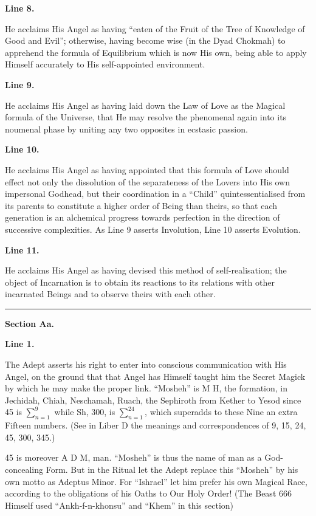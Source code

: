 \textbf{Line 8.}


He acclaims His Angel as having \enquote{eaten of the Fruit of the Tree of Knowledge of Good and Evil}; otherwise, having become wise (in the Dyad Chokmah) to apprehend the formula of Equilibrium which is now His own, being able to apply Himself accurately to His self-appointed environment.


\textbf{Line 9.}


He acclaims His Angel as having laid down the Law of Love as the Magical formula of the Universe, that He may resolve the phenomenal again into its noumenal phase by uniting any two opposites in ecstasic passion.


\textbf{Line 10.}


He acclaims His Angel as having appointed that this formula of Love should effect not only the dissolution of the separateness of the Lovers into His own impersonal Godhead, but their coordination in a \enquote{Child} quintessentialised from its parents to constitute a higher order of Being than theirs, so that each generation is an alchemical progress towards perfection in the direction of successive complexities. As Line 9 asserts Involution, Line 10 asserts Evolution.


\textbf{Line 11.}

He acclaims His Angel as having devised this method of self-realisation; the object of Incarnation is to obtain its reactions to its relations with other incarnated Beings and to observe theirs with each other.

{\centering
\rule{1in}{0.5pt}
\par}

\pagebreak[1]
\textbf{Section Aa.}

\textbf{Line 1.}


The Adept asserts his right to enter into conscious communication with His Angel, on the ground that that Angel has Himself taught him the Secret Magick by which he may make the proper link. \enquote{Mosheh} is M H, the formation, in Jechidah, Chiah, Neschamah, Ruach, \textemdash{} the Sephiroth from Kether to Yesod \textemdash{} since 45 is $\sum_{n=1}^{9}$ while Sh, 300, is $\sum_{n=1}^{24}$, which superadds to these Nine an extra Fifteen numbers. (See in Liber D the meanings and correspondences of 9, 15, 24, 45, 300, 345.)

45 is moreover A D M, man. \enquote{Mosheh} is thus the name of man as a God-concealing Form. But in the Ritual let the Adept replace this \enquote{Mosheh} by his own motto as Adeptus Minor. For \enquote{Ishrael} let him prefer his own Magical Race, according to the obligations of his Oaths to Our Holy Order! (The Beast 666 Himself used \enquote{Ankh-f-n-khonsu} and \enquote{Khem} in this section)


